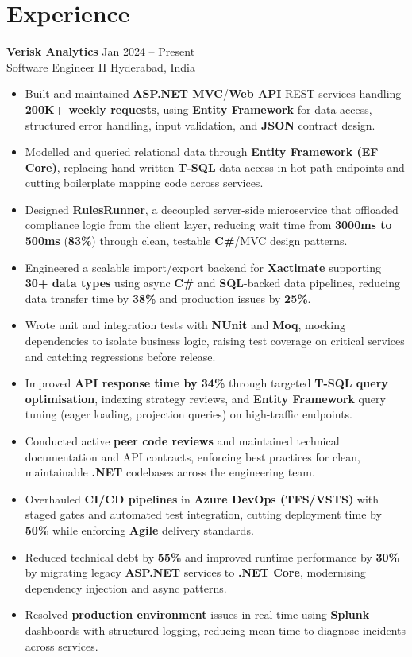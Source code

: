 \documentclass[10pt,letterpaper]{article}
\newcommand{\resumeSubheading}[4]{%
  \textbf{#1} \hfill #2 \\
  #3 \hfill #4 \\
}
\begin{document}
\section*{Experience}
\resumeSubheading{Verisk Analytics}{Jan 2024 -- Present}{Software Engineer II}{Hyderabad, India}
\begin{itemize}
    \item Built and maintained \textbf{ASP.NET MVC}/\textbf{Web API} REST services handling \textbf{200K+ weekly requests}, using \textbf{Entity Framework} for data access, structured error handling, input validation, and \textbf{JSON} contract design.
    \item Modelled and queried relational data through \textbf{Entity Framework (EF Core)}, replacing hand-written \textbf{T-SQL} data access in hot-path endpoints and cutting boilerplate mapping code across services.
    \item Designed \textbf{RulesRunner}, a decoupled server-side microservice that offloaded compliance logic from the client layer, reducing wait time from \textbf{3000ms to 500ms} (\textbf{83\%}) through clean, testable \textbf{C\#}/MVC design patterns.
    \item Engineered a scalable import/export backend for \textbf{Xactimate} supporting \textbf{30+ data types} using async \textbf{C\#} and \textbf{SQL}-backed data pipelines, reducing data transfer time by \textbf{38\%} and production issues by \textbf{25\%}.
    \item Wrote unit and integration tests with \textbf{NUnit} and \textbf{Moq}, mocking dependencies to isolate business logic, raising test coverage on critical services and catching regressions before release.
    \item Improved \textbf{API response time by 34\%} through targeted \textbf{T-SQL query optimisation}, indexing strategy reviews, and \textbf{Entity Framework} query tuning (eager loading, projection queries) on high-traffic endpoints.
    \item Conducted active \textbf{peer code reviews} and maintained technical documentation and API contracts, enforcing best practices for clean, maintainable \textbf{.NET} codebases across the engineering team.
    \item Overhauled \textbf{CI/CD pipelines} in \textbf{Azure DevOps (TFS/VSTS)} with staged gates and automated test integration, cutting deployment time by \textbf{50\%} while enforcing \textbf{Agile} delivery standards.
    \item Reduced technical debt by \textbf{55\%} and improved runtime performance by \textbf{30\%} by migrating legacy \textbf{ASP.NET} services to \textbf{.NET Core}, modernising dependency injection and async patterns.
    \item Resolved \textbf{production environment} issues in real time using \textbf{Splunk} dashboards with structured logging, reducing mean time to diagnose incidents across services.
\end{itemize}
\end{document}
